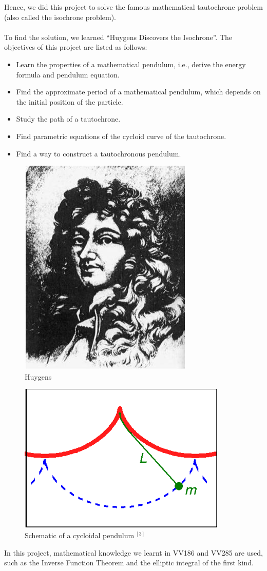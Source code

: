 \documentclass[12pt,a4paper]{article}
\begin{document}
Hence, we did this project to solve the famous mathematical tautochrone problem (also called the isochrone problem).\\
~\\
To find the solution, we learned “Huygens Discovers the Isochrone”. The objectives of this project are listed as follows:
\begin{itemize}  
\item Learn the properties of a mathematical pendulum, i.e., derive the energy formula and pendulum equation.
\item Find the approximate period of a mathematical pendulum, which depends on the initial position of the particle.
\item Study the path of a tautochrone.
\item Find parametric equations of the cycloid curve of the tautochrone.
\item Find a way to construct a tautochronous pendulum.
\end{itemize} 
\begin{figure}[!htbp]
    \centering
    \includegraphics[scale=0.35]{intro3.jpg}
    \caption{Huygens}
    \label{1}
\end{figure}
\begin{figure}[!htbp]
    \centering
    \includegraphics[scale=0.35]{intro4.png}
    \caption{Schematic of a cycloidal pendulum$~^{[3]}$}
    \label{1}
\end{figure}
In this project, mathematical knowledge we learnt in VV186 and VV285 are used, such as the Inverse Function Theorem and the elliptic integral of the first kind.\\
\end{document}
